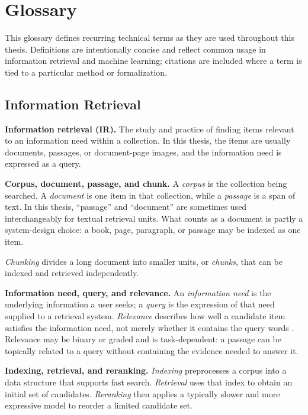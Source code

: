 \chapter{Glossary}
\label{ch:glossary}

This glossary defines recurring technical terms as they are used throughout this
thesis. Definitions are intentionally concise and reflect common usage in
information retrieval and machine learning; citations are included where a term
is tied to a particular method or formalization.

\section*{Information Retrieval}

\noindent\textbf{Information retrieval (IR).}
The study and practice of finding items relevant to an information need within a
collection. In this thesis, the items are usually documents, passages, or
document-page images, and the information need is expressed as a query.

\noindent\textbf{Corpus, document, passage, and chunk.}
A \emph{corpus} is the collection being searched. A \emph{document} is one item
in that collection, while a \emph{passage} is a span of text. In this thesis,
``passage'' and ``document'' are sometimes used interchangeably for textual
retrieval units. What counts as a document is partly a system-design choice: a
book, page, paragraph, or passage may be indexed as one item.

\emph{Chunking} divides a long document into smaller units, or \emph{chunks},
that can be indexed and retrieved independently.

\noindent\textbf{Information need, query, and relevance.}
An \emph{information need} is the underlying information a user seeks; a
\emph{query} is the expression of that need supplied to a retrieval system.
\emph{Relevance} describes how well a candidate item satisfies the information
need, not merely whether it contains the query words
. Relevance may be binary or graded and is
task-dependent: a passage can be topically related to a query without containing
the evidence needed to answer it.

\noindent\textbf{Indexing, retrieval, and reranking.}
\emph{Indexing} preprocesses a corpus into a data structure that supports fast
search. \emph{Retrieval} uses that index to obtain an initial set of candidates.
\emph{Reranking} then applies a typically slower and more expressive model to
reorder a limited candidate set.

